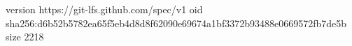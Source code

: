 version https://git-lfs.github.com/spec/v1
oid sha256:d6b52b5782ea65f5eb4d8d8f62090e69674a1bf3372b93488e0669572fb7de5b
size 2218
